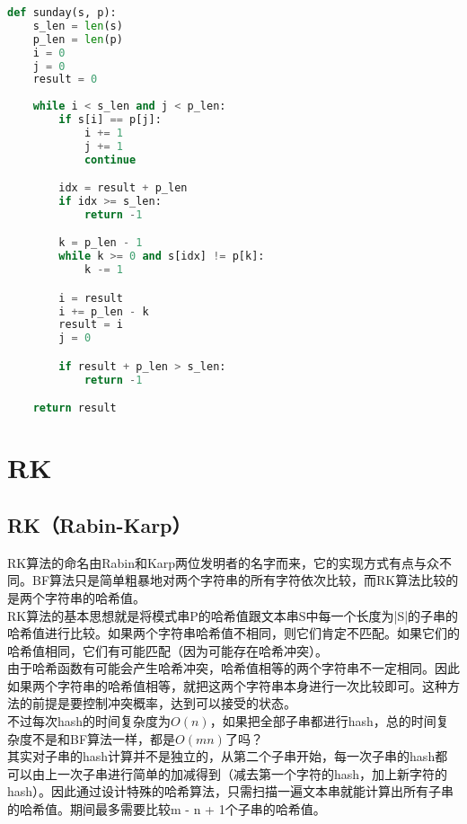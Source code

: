 \begin{lstlisting}[language=Python]
def sunday(s, p):
    s_len = len(s)
    p_len = len(p)
    i = 0
    j = 0
    result = 0
    
    while i < s_len and j < p_len:
        if s[i] == p[j]:
            i += 1
            j += 1
            continue

        idx = result + p_len
        if idx >= s_len:
            return -1

        k = p_len - 1
        while k >= 0 and s[idx] != p[k]:
            k -= 1

        i = result
        i += p_len - k
        result = i
        j = 0

        if result + p_len > s_len:
            return -1

    return result
\end{lstlisting}

\newpage

\section{RK}

\subsection{RK（Rabin-Karp）}

RK算法的命名由Rabin和Karp两位发明者的名字而来，它的实现方式有点与众不同。BF算法只是简单粗暴地对两个字符串的所有字符依次比较，而RK算法比较的是两个字符串的哈希值。\\

RK算法的基本思想就是将模式串P的哈希值跟文本串S中每一个长度为|S|的子串的哈希值进行比较。如果两个字符串哈希值不相同，则它们肯定不匹配。如果它们的哈希值相同，它们有可能匹配（因为可能存在哈希冲突）。\\

由于哈希函数有可能会产生哈希冲突，哈希值相等的两个字符串不一定相同。因此如果两个字符串的哈希值相等，就把这两个字符串本身进行一次比较即可。这种方法的前提是要控制冲突概率，达到可以接受的状态。\\

不过每次hash的时间复杂度为$ O(n) $，如果把全部子串都进行hash，总的时间复杂度不是和BF算法一样，都是$ O(mn) $了吗？\\

其实对子串的hash计算并不是独立的，从第二个子串开始，每一次子串的hash都可以由上一次子串进行简单的加减得到（减去第一个字符的hash，加上新字符的hash）。因此通过设计特殊的哈希算法，只需扫描一遍文本串就能计算出所有子串的哈希值。期间最多需要比较m - n + 1个子串的哈希值。\\

